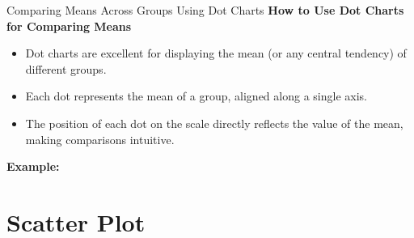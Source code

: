 \documentclass[handout]{beamer} %
\begin{document}
\begin{frame}{Comparing Means Across Groups Using Dot Charts}
    \textbf{How to Use Dot Charts for Comparing Means}
    \begin{itemize}
        \item Dot charts are excellent for displaying the mean (or any central tendency) of different groups.
        \item Each dot represents the mean of a group, aligned along a single axis.
        \item The position of each dot on the scale directly reflects the value of the mean, making comparisons intuitive.
    \end{itemize}

    \textbf{Example:}
    \begin{center}
    \end{center}
\end{frame}

\section{Scatter Plot}
\end{document}
